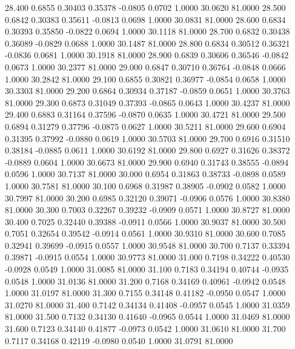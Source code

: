   28.400   0.6855   0.30403   0.35378  -0.0805   0.0702   1.0000  30.0620  81.0000
  28.500   0.6842   0.30383   0.35611  -0.0813   0.0698   1.0000  30.0831  81.0000
  28.600   0.6834   0.30393   0.35850  -0.0822   0.0694   1.0000  30.1118  81.0000
  28.700   0.6832   0.30438   0.36089  -0.0829   0.0688   1.0000  30.1487  81.0000
  28.800   0.6834   0.30512   0.36321  -0.0836   0.0681   1.0000  30.1918  81.0000
  28.900   0.6839   0.30606   0.36546  -0.0842   0.0673   1.0000  30.2377  81.0000
  29.000   0.6847   0.30710   0.36764  -0.0848   0.0666   1.0000  30.2842  81.0000
  29.100   0.6855   0.30821   0.36977  -0.0854   0.0658   1.0000  30.3303  81.0000
  29.200   0.6864   0.30934   0.37187  -0.0859   0.0651   1.0000  30.3763  81.0000
  29.300   0.6873   0.31049   0.37393  -0.0865   0.0643   1.0000  30.4237  81.0000
  29.400   0.6883   0.31164   0.37596  -0.0870   0.0635   1.0000  30.4721  81.0000
  29.500   0.6894   0.31279   0.37796  -0.0875   0.0627   1.0000  30.5211  81.0000
  29.600   0.6904   0.31395   0.37992  -0.0880   0.0619   1.0000  30.5703  81.0000
  29.700   0.6916   0.31510   0.38184  -0.0885   0.0611   1.0000  30.6192  81.0000
  29.800   0.6927   0.31626   0.38372  -0.0889   0.0604   1.0000  30.6673  81.0000
  29.900   0.6940   0.31743   0.38555  -0.0894   0.0596   1.0000  30.7137  81.0000
  30.000   0.6954   0.31863   0.38733  -0.0898   0.0589   1.0000  30.7581  81.0000
  30.100   0.6968   0.31987   0.38905  -0.0902   0.0582   1.0000  30.7997  81.0000
  30.200   0.6985   0.32120   0.39071  -0.0906   0.0576   1.0000  30.8380  81.0000
  30.300   0.7003   0.32267   0.39232  -0.0909   0.0571   1.0000  30.8727  81.0000
  30.400   0.7025   0.32440   0.39388  -0.0911   0.0566   1.0000  30.9037  81.0000
  30.500   0.7051   0.32654   0.39542  -0.0914   0.0561   1.0000  30.9310  81.0000
  30.600   0.7085   0.32941   0.39699  -0.0915   0.0557   1.0000  30.9548  81.0000
  30.700   0.7137   0.33394   0.39871  -0.0915   0.0554   1.0000  30.9773  81.0000
  31.000   0.7198   0.34222   0.40530  -0.0928   0.0549   1.0000  31.0085  81.0000
  31.100   0.7183   0.34194   0.40744  -0.0935   0.0548   1.0000  31.0136  81.0000
  31.200   0.7168   0.34169   0.40961  -0.0942   0.0548   1.0000  31.0197  81.0000
  31.300   0.7155   0.34148   0.41182  -0.0950   0.0547   1.0000  31.0270  81.0000
  31.400   0.7142   0.34134   0.41408  -0.0957   0.0545   1.0000  31.0359  81.0000
  31.500   0.7132   0.34130   0.41640  -0.0965   0.0544   1.0000  31.0469  81.0000
  31.600   0.7123   0.34140   0.41877  -0.0973   0.0542   1.0000  31.0610  81.0000
  31.700   0.7117   0.34168   0.42119  -0.0980   0.0540   1.0000  31.0791  81.0000
